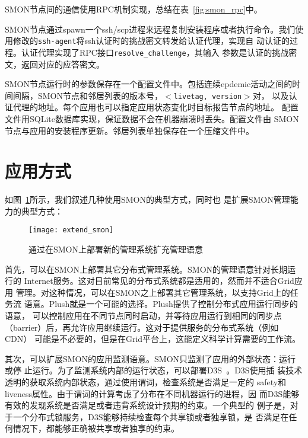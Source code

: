 SMON节点间的通信使用RPC机制实现，总结在表~\ref{fig:smon_rpc}中。

SMON节点通过spawn一个ssh/scp进程来远程复制安装程序或者执行命令。我们使
用修改的\texttt{ssh-agent}将ssh认证时的挑战密文转发给认证代理，实现自
动认证的过程。认证代理实现了RPC接口\texttt{resolve\_challenge}，其输入
参数是认证的挑战密文，返回对应的应答密文。

SMON节点运行时的参数保存在一个配置文件中。包括连续epdemic活动之间的时
间间隔，SMON节点和邻居列表的版本号，$<$\texttt{livetag, version}$>$对，
以及认证代理的地址。每个应用也可以指定应用状态变化时目标报告节点的地址。
配置文件用SQLite数据库实现，保证数据不会在机器崩溃时丢失。配置文件由
SMON节点与应用的安装程序更新。邻居列表单独保存在一个压缩文件中。


\section{应用方式}
\label{sec:smon_app}

如图~\ref{fig:extend_smon}所示，我们叙述几种使用SMON的典型方式，同时也
是扩展SMON管理能力的典型方式：

\begin{figure}[htbp]
\centering
\begin{minipage}{0.8\linewidth}
\centering
\texttt{[image: extend\_smon]}
\caption{通过在SMON上部署新的管理系统扩充管理语意}
\label{fig:extend_smon}
\end{minipage}
\end{figure}

首先，可以在SMON上部署其它分布式管理系统。SMON的管理语意针对长期运行的
Internet服务。这对目前常见的分布式系统都是适用的，然而并不适合Grid应用
管理。对这种情况，可以在SMON之上部署其它管理系统，以支持Grid上的任务流
语意。Plush就是一个可能的选择。Plush提供了控制分布式应用运行同步的语意，
可以控制应用在不同节点同时启动，并等待应用运行到相同的同步点
（barrier）后，再允许应用继续运行。这对于提供服务的分布式系统（例如CDN）
可能是不必要的，但是在Grid平台上，这能定义科学计算需要的工作流。

其次，可以扩展SMON的应用监测语意。SMON只监测了应用的外部状态：运行或停
止运行。为了监测系统内部的运行状态，可以部署D3S~\cite{d3s}。D3S使用插
装技术透明的获取系统内部状态，通过使用谓词，检查系统是否满足一定的
safety和liveness属性。由于谓词的计算考虑了分布在不同机器运行的进程，因
而D3S能够有效的发现系统是否满足或者违背系统设计预期的约束。一个典型的
例子是，对于一个分布式锁服务，D3S能够持续检查每个共享锁或者独享锁，是
否满足在任何情况下，都能够正确被共享或者独享的约束。

